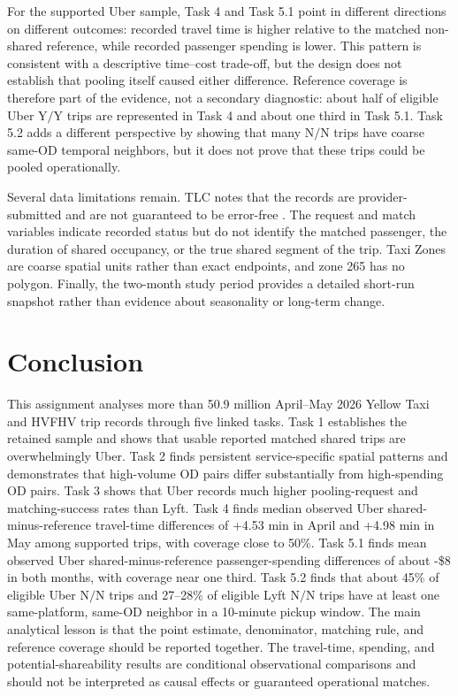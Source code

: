 \documentclass[10pt,a4paper]{article}
\newcommand{\usd}{\$}
\newcommand{\NN}{\ensuremath{\mathrm{N/N}}}
\newcommand{\YY}{\ensuremath{\mathrm{Y/Y}}}
\begin{document}
For the supported Uber sample, Task 4 and Task 5.1 point in different directions on different outcomes: recorded travel time is higher relative to the matched non-shared reference, while recorded passenger spending is lower. This pattern is consistent with a descriptive time--cost trade-off, but the design does not establish that pooling itself caused either difference. Reference coverage is therefore part of the evidence, not a secondary diagnostic: about half of eligible Uber \YY{} trips are represented in Task 4 and about one third in Task 5.1. Task 5.2 adds a different perspective by showing that many \NN{} trips have coarse same-OD temporal neighbors, but it does not prove that these trips could be pooled operationally.

Several data limitations remain. TLC notes that the records are provider-submitted and are not guaranteed to be error-free \cite{tlc_tripdata}. The request and match variables indicate recorded status but do not identify the matched passenger, the duration of shared occupancy, or the true shared segment of the trip. Taxi Zones are coarse spatial units rather than exact endpoints, and zone 265 has no polygon. Finally, the two-month study period provides a detailed short-run snapshot rather than evidence about seasonality or long-term change.

\section{Conclusion}
This assignment analyses more than 50.9 million April--May 2026 Yellow Taxi and HVFHV trip records through five linked tasks. Task 1 establishes the retained sample and shows that usable reported matched shared trips are overwhelmingly Uber. Task 2 finds persistent service-specific spatial patterns and demonstrates that high-volume OD pairs differ substantially from high-spending OD pairs. Task 3 shows that Uber records much higher pooling-request and matching-success rates than Lyft. Task 4 finds median observed Uber shared-minus-reference travel-time differences of +4.53 min in April and +4.98 min in May among supported trips, with coverage close to 50\%. Task 5.1 finds mean observed Uber shared-minus-reference passenger-spending differences of about -\usd8 in both months, with coverage near one third. Task 5.2 finds that about 45\% of eligible Uber \NN{} trips and 27--28\% of eligible Lyft \NN{} trips have at least one same-platform, same-OD neighbor in a 10-minute pickup window. The main analytical lesson is that the point estimate, denominator, matching rule, and reference coverage should be reported together. The travel-time, spending, and potential-shareability results are conditional observational comparisons and should not be interpreted as causal effects or guaranteed operational matches.
\end{document}
